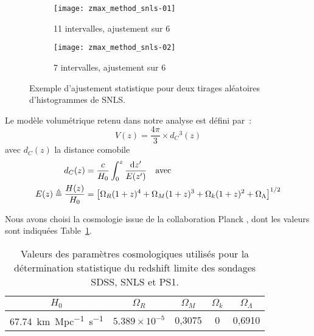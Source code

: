 \documentclass[../main/main.tex]{subfiles}
\begin{document}
\begin{figure}[ht]
    \centering
    \begin{subfigure}[]{.49\linewidth}
        \centering
        \texttt{[image: zmax\_method\_snls-01]}
        \captionsetup{justification=centering}
        \caption{11 intervalles, ajustement sur 6}
        \label{fig:zmax_method1}
    \end{subfigure}
    \begin{subfigure}[]{.49\linewidth}
        \centering
        \texttt{[image: zmax\_method\_snls-02]}
        \captionsetup{justification=centering}
        \caption{7 intervalles, ajustement sur 6}
        \label{fig:zmax_method2}
    \end{subfigure}
    \captionsetup{justification=centering}
    \caption{Exemple d'ajustement statistique pour deux tirages aléatoires
    d'histogrammes de SNLS.}
    \label{fig:zmax_method}
\end{figure}


Le modèle volumétrique retenu dans notre analyse est défini par~:
\begin{equation}\label{eq:comobvol}
    V(z) = \frac{4\pi}{3}\times d_C{}^3(z)
\end{equation}
avec $d_C(z)$ la distance comobile
\begin{align}
    d_C(z)                           & =
    \frac{c}{H_0} \int_{0}^{z} \frac{\mathrm{d} z'}{E(z')}
    \quad\text{avec}\quad\\
    E(z) \triangleq \frac{H(z)}{H_0} & =
    \left[\Omega_R(1+z)^4 + \Omega_M(1+z)^3 +
        \Omega_k(1+z)^2 + \Omega_\Lambda
    \right]^{1/2}
\end{align}

Nous avons choisi la cosmologie issue de la collaboration Planck
\citep{planck2018}, dont les valeurs sont indiquées Table~\ref{tab:planckvals}.

\begin{table}[ht]
    \centering
    \caption[Valeurs des paramètres cosmologiques utilisés pour la détermination
    statistique du redshift limite des sondages SDSS, SNLS et PS1]{Valeurs des
        paramètres cosmologiques utilisés pour la détermination statistique du
    redshift limite des sondages SDSS, SNLS et PS1.}
    \label{tab:planckvals}
    \begin{tabular}{ccccc}
        \toprule
        $H_0$ &
        $\Omega_R$ & $\Omega_M$ & $\Omega_k$ & $\Omega_\Lambda$ \\
        \midrule
        \SI{67,74}{km.Mpc^{-1}.s^{-1}} &
        $5.389\times10^{-5}$ & 0,3075 & 0 & 0,6910 \\ 
        \bottomrule
    \end{tabular}
\end{table}
\end{document}
